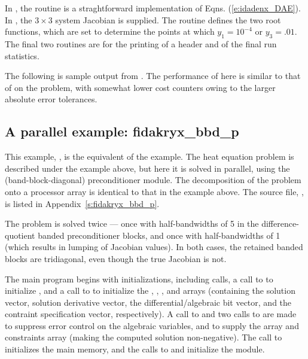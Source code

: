In , the  routine is a straghtforward
implementation of Eqns. (\ref{e:idadenx_DAE}).  In , the 
$3 \times 3$ system Jacobian is supplied.  The  routine
defines the two root functions, which are set to determine the points at which
$y_1 = 10^{-4}$ or $y_3 = .01$.  The final two routines are for the
printing of a header and of the final run statistics.

The following is sample output from .
The performance of {\fida} here is similar to that of {\ida} on
the  problem, with somewhat lower cost counters owing to
the larger absolute error tolerances.



\subsection{A parallel example: fidakryx\_bbd\_p}\label{ss:fidakryx_bbd_p}

This example, , is the {\F} equivalent of the
 example.  The heat equation problem is described
under the  example above, but here it is solved in
parallel, using the {\idabbdpre} (band-block-diagonal) preconditioner
module.  The decomposition of the problem onto a processor array is
identical to that in the  example above.  The source file,
, is listed in Appendix~\ref{s:fidakryx_bbd_p}.

The problem is solved twice --- once with half-bandwidths of 5 in the
difference-quotient banded preconditioner blocks, and once with
half-bandwidths of 1 (which results in lumping of Jacobian values).
In both cases, the retained banded blocks are tridiagonal, even though
the true Jacobian is not.

The main program begins with initializations, including {\mpi} calls,
a call to  to initialize {\nvecp}, and a call to
 to initialize the , , , and
 arrays (containing the solution vector, solution derivative vector,
the differential/algebraic bit vector, and the contraint specification
vector, respectively).  A call to  and two calls to
 are made to suppress error control on the algebraic
variables, and to supply the  array and constraints array (making
the computed solution non-negative).  The call to 
initializes the {\fida} main memory, and the calls to 
and  initialize the {\fidabbd} module.

